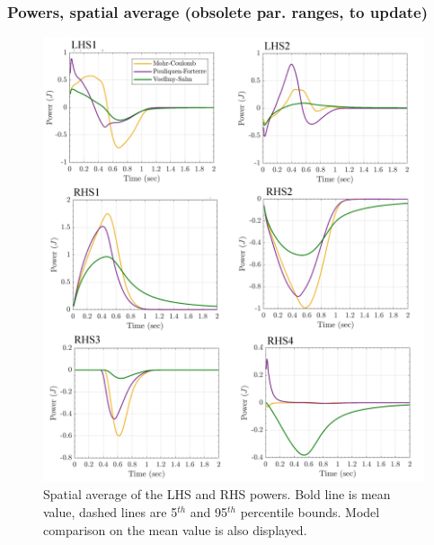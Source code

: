 \documentclass{article}
\begin{document}
\subsubsection{Powers, spatial average (obsolete par. ranges, to update)}
\begin{figure}[H]
        \centering
        \includegraphics[width=1\textwidth]{Figures/Powers_combine.png}
        \caption{Spatial average of the LHS and RHS powers. Bold line is mean value, dashed lines are 5$^{th}$ and 95$^{th}$ percentile bounds. Model comparison on the mean value is also displayed.}
        \label{fig:Ramp-Power-spatial}
\end{figure}
\end{document}
